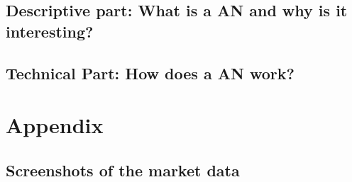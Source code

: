 \documentclass[11pt,oneside,a4paper]{article}
\makeatletter
\def\cleardoublepage{\clearpage\if@twoside \ifodd\c@page\else%
	\hbox{}%
	\thispagestyle{empty}%
	\clearpage%
	\if@twocolumn\hbox{}\clearpage\fi\fi\fi}
\makeatother
\begin{document}
	\subsection{Descriptive part: What is a AN and why is it interesting?}
	\subsection{Technical Part: How does a AN work?}
	\cleardoublepage
	\section{Appendix}
	\subsection{Screenshots of the market data}
	
	\newpage
	
	
\end{document}
